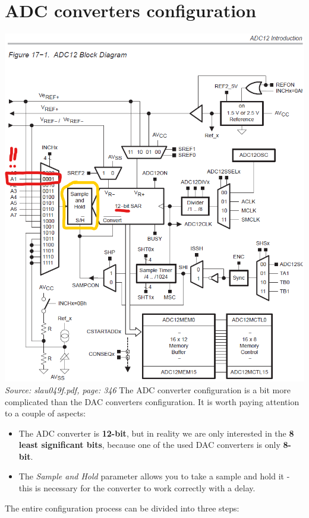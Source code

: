 \documentclass{article}
\begin{document}
\section{ADC converters configuration}
\includegraphics[width=\textwidth]{"../img/slau049f_346.png"} \\
\textit{Source: slau049f.pdf, page: 346}
\newpage
The ADC converter configuration is a bit more complicated than the DAC converters configuration. It is worth paying attention to a couple of aspects:
\begin{itemize}
    \item The ADC converter is \textbf{12-bit}, but in reality we are only interested in the \textbf{8 least significant bits}, because one of the used DAC converters is only \textbf{8-bit}.
    \item The \textit{Sample and Hold} parameter allows you to take a sample and hold it - this is necessary for the converter to work correctly with a delay.
\end{itemize}
The entire configuration process can be divided into three steps:
\end{document}
